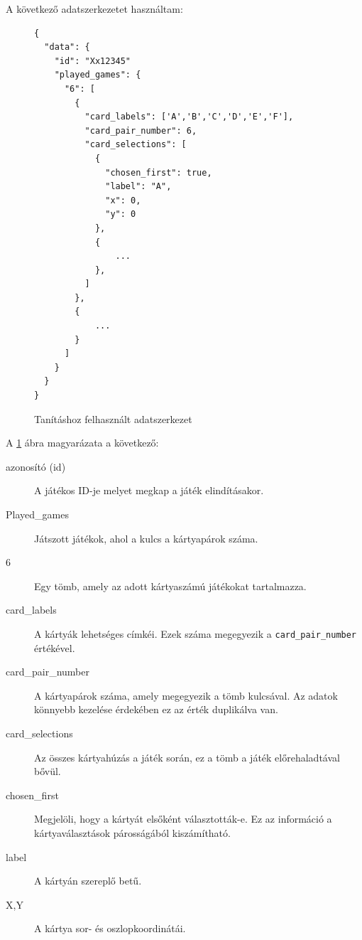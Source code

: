A következő adatszerkezetet használtam: 

\begin{figure}[h]
\centering
 \begin{lstlisting}
{
  "data": { 
    "id": "Xx12345"
    "played_games": {
      "6": [
        {
          "card_labels": ['A','B','C','D','E','F'], 
          "card_pair_number": 6,
          "card_selections": [ 
            {
              "chosen_first": true,
              "label": "A",
              "x": 0,
              "y": 0
            },
            {
                ...
            },
          ]
        },
        {
            ...
        }
      ]
    }
  }
}
\end{lstlisting}
\caption{Tanításhoz felhasznált adatszerkezet}
\label{saveJson}
\end{figure}


A \ref{saveJson} ábra magyarázata a következő:
\begin{description}
    \item[azonosító (id)] A játékos ID-je melyet megkap a játék elindításakor. 
    \item[Played\_games] Játszott játékok, ahol a kulcs a kártyapárok száma.
    \item[6\:] Egy tömb, amely az adott kártyaszámú játékokat tartalmazza.
    \item[card\_labels\:] A kártyák lehetséges címkéi. Ezek száma megegyezik a \lstinline{card_pair_number} értékével.
    \item[card\_pair\_number\:] A kártyapárok száma, amely megegyezik a tömb kulcsával. Az adatok könnyebb kezelése érdekében ez az érték duplikálva van.
    \item[card\_selections\:] Az összes kártyahúzás a játék során, ez a tömb a játék előrehaladtával bővül.
    \item[chosen\_first\:] Megjelöli, hogy a kártyát elsőként választották-e. Ez az információ a kártyaválasztások párosságából kiszámítható.
    \item[label\:] A kártyán szereplő betű.
    \item[X,Y\:] A kártya sor- és oszlopkoordinátái.
\end{description}
